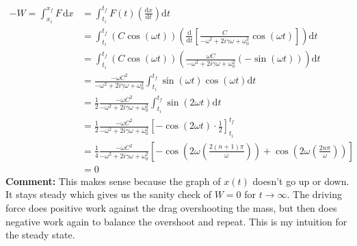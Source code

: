\documentclass[12pt,letter]{article}
\begin{document}
\begin{align*}
	-W = \int_{x_i}^{x_f} F \, \mathrm{d} x &= \int_{t_i}^{t_f}   F(t) 
	\left(\frac{\mathrm{d} x}{\mathrm{d} t}\right)\mathrm{d}  t \\
	&= \int_{t_i}^{t_f} (C \cos(\omega t) ) 
	\left( \frac{\mathrm{d} }{\mathrm{d} t} 
		\left[ \frac{C}{- \omega^2 + 2 i \gamma \omega + \omega_0^2 } \cos (\omega t) \right] 
	\right) \mathrm{d} t \\ 
	&= \int_{t_i}^{t_f} (C \cos( \omega t) ) 
	\left(
\frac{ \omega C}{- \omega^2 + 2 i \gamma \omega + \omega_0^2 } (- \sin (\omega t )) 
	\right) \mathrm{d} t\\ 
	&= \frac{- \omega C^2 }{ - \omega^2 + 2 i \gamma \omega + \omega_0^2 } \int_{t_i}^{t_f}  \sin(\omega t) \cos (\omega t ) \mathrm{d}  t \\
	&=  \frac{1}{2 } \frac{- \omega C^2 }{ - \omega^2 + 2 i \gamma \omega + \omega_0^2 } \int_{t_i}^{t_f}  \sin ( 2 \omega t  ) \mathrm{d}  t \\
	&=  \frac{1}{2 } \frac{- \omega C^2 }{ - \omega^2 + 2 i \gamma \omega + \omega_0^2 } 
	\left[ - \cos(2 \omega t) \cdot  \frac{1}{2} \right]_{t_i}^{t_f}  \\
	&=  \frac{1}{4 } \frac{- \omega C^2 }{ - \omega^2 + 2 i \gamma \omega + \omega_0^2 } 
\left[ - \cos\left(2 \omega \left( \frac{2(n+1)\pi}{\omega} \right)\right) + \cos 
\left(
2 \omega \left( \frac{2 n \pi }{\omega }\right)
\right)\right]  \\ 
	&= 0 
\end{align*}
\textbf{Comment:} This makes sense because the graph of $x(t)$ doesn't go up or down. It stays steady which gives us the sanity check of $W = 0$ for $t \to  \infty$. The driving force does positive work against the drag overshooting the mass, but then does negative work again to balance the overshoot and repeat. This is my intuition for the steady state. 
\end{document}
